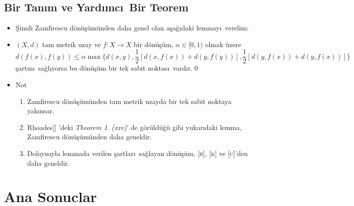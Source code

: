 \documentclass[8pt]{beamer}
\begin{document}
\subsection{Bir Tan\i m ve Yard\i mc\i\ Bir Teorem}
\begin{frame}
\begin{itemize}[<+-| alert@+>]  

 \item[] \c{S}imdi Zamfirescu d\"{o}n\"{u}\c{s}\"{u}m\"{u}nden daha genel olan a\c{s}a\u{g}\i daki lemmay\i\ verelim:

 \item[] \begin{lemma}
  $(X,d)$ tam metrik uzay ve $f: X \rightarrow X$ bir d\"{o}n\"{u}\c{s}\"{u}m,
  $\alpha \in [0,1)$ olmak \"uzere
  \begin{equation*}
    d(f(x), f(y))\leq \alpha\max\bigg\{ d(x,y), \frac{1}{2}[d(x,f(x))+d(y,f(y))], \frac{1}{2}[d(y,f(x))+d(y,f(x))] \bigg\} 
  \end{equation*}
  \c{s}art\i n\i\ sa\u{g}l\i yorsa bu d\"{o}n\"{u}\c{s}\"{u}m bir tek sabit noktas\i\ vard\i r.\qed
\end{lemma}

  \item[] \begin{block}{Not}
  \begin{enumerate}
  \item Zamfirescu d\"{o}n\"{u}\c{s}\"{u}m\"{u}nden tam metrik uzayda bir tek sabit noktaya yak\i nsar.
  \item Rhoades[] 'deki \emph{Theorem 1}. \emph{(xxv)}' de  g\"or\"uld\"u\u{g}\"u gibi yukar\i daki lemma,  Zamfirescu d\"{o}n\"{u}\c{s}\"{u}m\"{u}nden daha geneldir.  \item Dolay\i s\i yla lemmada verilen \c{s}artlar\i\ sa\u{g}layan d\"{o}n\"{u}\c{s}\"{u}m, \textsc{[b]}, \textsc{[k]} ve \textsc{[c]}'den daha geneldir.
\end{enumerate}
\end{block}
\end{itemize}

\end{frame}%

\section{Ana Sonuclar}
\end{document}
